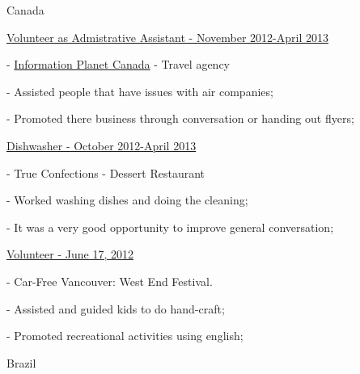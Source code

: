 \documentclass[12pt,oneside,a4paper]{article}
\begin{document}
\begin{compactitem}
  \item [ ] Canada
	\item \underline{Volunteer as Admistrative Assistant - November 2012-April 2013}
    \begin{compactitem}
       \item [-] \href{http://www.informationplanet.ca}{Information Planet Canada} - Travel agency
       \item [-] Assisted people that have issues with air companies;
       \item [-] Promoted there business through conversation or handing out flyers;
    \end{compactitem}
	\item \underline{Dishwasher - October 2012-April 2013}
    \begin{compactitem}
       \item [-] True Confections - Dessert Restaurant
       \item [-] Worked washing dishes and doing the cleaning;
       \item [-] It was a very good opportunity to improve general conversation;
    \end{compactitem}
	\item \underline{Volunteer - June 17, 2012}
    \begin{compactitem}
       \item [-] Car-Free Vancouver: West End Festival.
       \item [-] Assisted and guided kids to do hand-craft;
       \item [-] Promoted recreational activities using english;
    \end{compactitem}
  \item [ ]
  \item [ ] Brazil

\end{compactitem}
\end{document}
